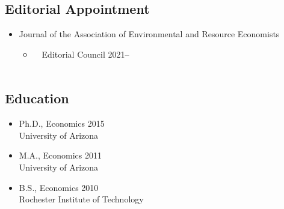 \documentclass[11pt]{res} %
\begin{document}
\begin{resume}
\subsection{Editorial Appointment}
	\begin{itemize} \itemsep -12pt
		\item[] Journal of the Association of Environmental and Resource Economists 
		\vspace{-0.05in} 
		\begin{itemize}
			\item[] \,\,\,\, Editorial Council \hfill 2021-- \\\
		\end{itemize}
	\end{itemize}
\vspace{-0.5in}

\subsection{Education}


	\begin{itemize}
		\item[] Ph.D., Economics \hfill 2015\\
		University of Arizona

		\item[] M.A., Economics \hfill 2011\\
		University of Arizona

		\item[] B.S.,  Economics \hfill 2010\\
		Rochester Institute of Technology

	\end{itemize}
\vspace{-.2in}

\end{resume}
\end{document}
